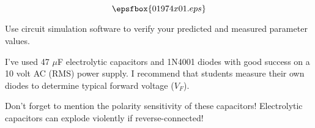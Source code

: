 

$$\epsfbox{01974x01.eps}$$

\vfil \eject






Use circuit simulation software to verify your predicted and measured parameter values.







I've used 47 $\mu$F electrolytic capacitors and 1N4001 diodes with good success on a 10 volt AC (RMS) power supply.  I recommend that students measure their own diodes to determine typical forward voltage ($V_F$).

Don't forget to mention the polarity sensitivity of these capacitors!  Electrolytic capacitors can explode violently if reverse-connected!




